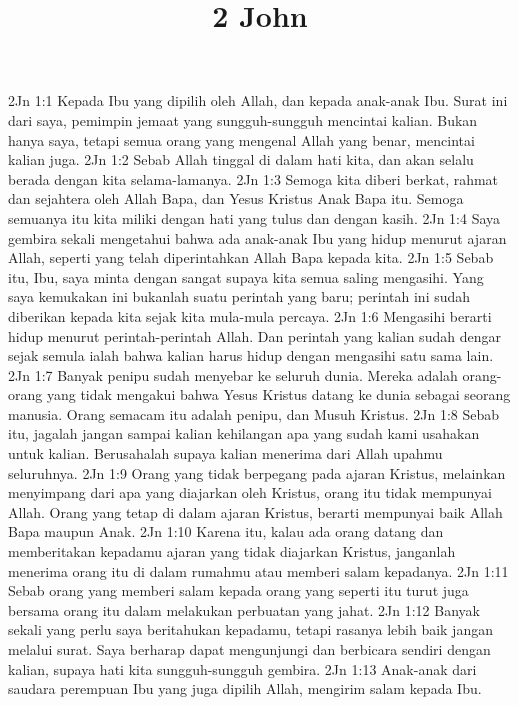 

\title{2 John}

2Jn 1:1  Kepada Ibu yang dipilih oleh Allah, dan kepada anak-anak Ibu. Surat ini dari saya, pemimpin jemaat yang sungguh-sungguh mencintai kalian. Bukan hanya saya, tetapi semua orang yang mengenal Allah yang benar, mencintai kalian juga.
2Jn 1:2  Sebab Allah tinggal di dalam hati kita, dan akan selalu berada dengan kita selama-lamanya.
2Jn 1:3  Semoga kita diberi berkat, rahmat dan sejahtera oleh Allah Bapa, dan Yesus Kristus Anak Bapa itu. Semoga semuanya itu kita miliki dengan hati yang tulus dan dengan kasih.
2Jn 1:4  Saya gembira sekali mengetahui bahwa ada anak-anak Ibu yang hidup menurut ajaran Allah, seperti yang telah diperintahkan Allah Bapa kepada kita.
2Jn 1:5  Sebab itu, Ibu, saya minta dengan sangat supaya kita semua saling mengasihi. Yang saya kemukakan ini bukanlah suatu perintah yang baru; perintah ini sudah diberikan kepada kita sejak kita mula-mula percaya.
2Jn 1:6  Mengasihi berarti hidup menurut perintah-perintah Allah. Dan perintah yang kalian sudah dengar sejak semula ialah bahwa kalian harus hidup dengan mengasihi satu sama lain.
2Jn 1:7  Banyak penipu sudah menyebar ke seluruh dunia. Mereka adalah orang-orang yang tidak mengakui bahwa Yesus Kristus datang ke dunia sebagai seorang manusia. Orang semacam itu adalah penipu, dan Musuh Kristus.
2Jn 1:8  Sebab itu, jagalah jangan sampai kalian kehilangan apa yang sudah kami usahakan untuk kalian. Berusahalah supaya kalian menerima dari Allah upahmu seluruhnya.
2Jn 1:9  Orang yang tidak berpegang pada ajaran Kristus, melainkan menyimpang dari apa yang diajarkan oleh Kristus, orang itu tidak mempunyai Allah. Orang yang tetap di dalam ajaran Kristus, berarti mempunyai baik Allah Bapa maupun Anak.
2Jn 1:10  Karena itu, kalau ada orang datang dan memberitakan kepadamu ajaran yang tidak diajarkan Kristus, janganlah menerima orang itu di dalam rumahmu atau memberi salam kepadanya.
2Jn 1:11  Sebab orang yang memberi salam kepada orang yang seperti itu turut juga bersama orang itu dalam melakukan perbuatan yang jahat.
2Jn 1:12  Banyak sekali yang perlu saya beritahukan kepadamu, tetapi rasanya lebih baik jangan melalui surat. Saya berharap dapat mengunjungi dan berbicara sendiri dengan kalian, supaya hati kita sungguh-sungguh gembira.
2Jn 1:13  Anak-anak dari saudara perempuan Ibu yang juga dipilih Allah, mengirim salam kepada Ibu.


